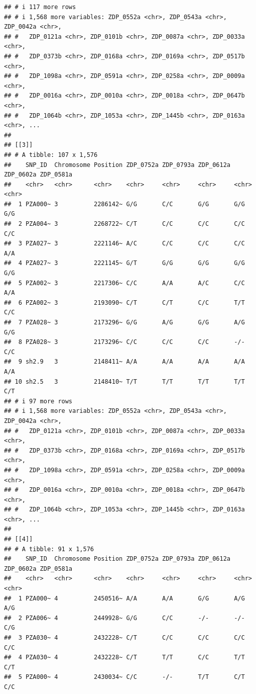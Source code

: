 \documentclass[
]{article}
\begin{document}
\begin{verbatim}
## # i 117 more rows
## # i 1,568 more variables: ZDP_0552a <chr>, ZDP_0543a <chr>, ZDP_0042a <chr>,
## #   ZDP_0121a <chr>, ZDP_0101b <chr>, ZDP_0087a <chr>, ZDP_0033a <chr>,
## #   ZDP_0373b <chr>, ZDP_0168a <chr>, ZDP_0169a <chr>, ZDP_0517b <chr>,
## #   ZDP_1098a <chr>, ZDP_0591a <chr>, ZDP_0258a <chr>, ZDP_0009a <chr>,
## #   ZDP_0016a <chr>, ZDP_0010a <chr>, ZDP_0018a <chr>, ZDP_0647b <chr>,
## #   ZDP_1064b <chr>, ZDP_1053a <chr>, ZDP_1445b <chr>, ZDP_0163a <chr>, ...
## 
## [[3]]
## # A tibble: 107 x 1,576
##    SNP_ID  Chromosome Position ZDP_0752a ZDP_0793a ZDP_0612a ZDP_0602a ZDP_0581a
##    <chr>   <chr>      <chr>    <chr>     <chr>     <chr>     <chr>     <chr>    
##  1 PZA000~ 3          2286142~ G/G       C/C       G/G       G/G       G/G      
##  2 PZA004~ 3          2268722~ C/T       C/C       C/C       C/C       C/C      
##  3 PZA027~ 3          2221146~ A/C       C/C       C/C       C/C       A/A      
##  4 PZA027~ 3          2221145~ G/T       G/G       G/G       G/G       G/G      
##  5 PZA002~ 3          2217306~ C/C       A/A       A/C       C/C       A/A      
##  6 PZA002~ 3          2193090~ C/T       C/T       C/C       T/T       C/C      
##  7 PZA028~ 3          2173296~ G/G       A/G       G/G       A/G       G/G      
##  8 PZA028~ 3          2173296~ C/C       C/C       C/C       -/-       C/C      
##  9 sh2.9   3          2148411~ A/A       A/A       A/A       A/A       A/A      
## 10 sh2.5   3          2148410~ T/T       T/T       T/T       T/T       C/T      
## # i 97 more rows
## # i 1,568 more variables: ZDP_0552a <chr>, ZDP_0543a <chr>, ZDP_0042a <chr>,
## #   ZDP_0121a <chr>, ZDP_0101b <chr>, ZDP_0087a <chr>, ZDP_0033a <chr>,
## #   ZDP_0373b <chr>, ZDP_0168a <chr>, ZDP_0169a <chr>, ZDP_0517b <chr>,
## #   ZDP_1098a <chr>, ZDP_0591a <chr>, ZDP_0258a <chr>, ZDP_0009a <chr>,
## #   ZDP_0016a <chr>, ZDP_0010a <chr>, ZDP_0018a <chr>, ZDP_0647b <chr>,
## #   ZDP_1064b <chr>, ZDP_1053a <chr>, ZDP_1445b <chr>, ZDP_0163a <chr>, ...
## 
## [[4]]
## # A tibble: 91 x 1,576
##    SNP_ID  Chromosome Position ZDP_0752a ZDP_0793a ZDP_0612a ZDP_0602a ZDP_0581a
##    <chr>   <chr>      <chr>    <chr>     <chr>     <chr>     <chr>     <chr>    
##  1 PZA000~ 4          2450516~ A/A       A/A       G/G       A/G       A/G      
##  2 PZA006~ 4          2449928~ G/G       C/C       -/-       -/-       C/G      
##  3 PZA030~ 4          2432228~ C/T       C/C       C/C       C/C       C/C      
##  4 PZA030~ 4          2432228~ C/T       T/T       C/C       T/T       C/T      
##  5 PZA000~ 4          2430034~ C/C       -/-       T/T       C/T       C/C      

\end{verbatim}
\end{document}
